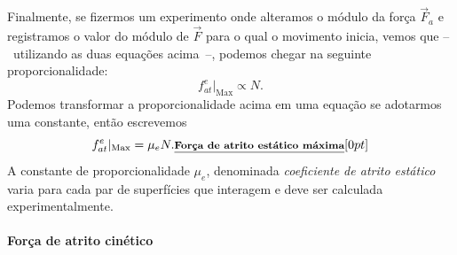 Finalmente, se fizermos um experimento onde alteramos o módulo da força $\vec{F}_a$ e registramos o valor do módulo de $\vec{F}$ para o qual o movimento inicia, vemos que --~utilizando as duas equações acima~--, podemos chegar na seguinte proporcionalidade:
\begin{equation}
    f_{at}^e|_{\textrm{Max}} \propto N.
\end{equation}
%
Podemos transformar a proporcionalidade acima em uma equação se adotarmos uma constante, então escrevemos
\begin{equation}
  f_{at}^e|_{\textrm{Max}} = \mu_e N. \relax{\footnotesize\emph{\textbf{Força de atrito estático máxima}}}[0pt]
\end{equation}
%
A constante de proporcionalidade $\mu_e$, denominada \emph{coeficiente de atrito estático} varia para cada par de superfícies que interagem e deve ser calculada experimentalmente.

\paragraph{Força de atrito cinético} 


